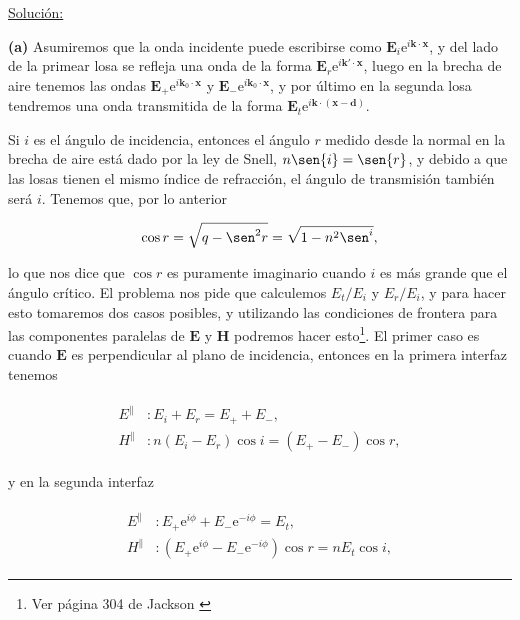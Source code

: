 \documentclass[a4paper,11pt]{article}
\numberwithin{equation}{section}
\newcommand{\euler}{\mathrm{e}}
\begin{document}
\vspace{.3cm}

\underline{Solución:} \vspace{.3cm}

\textbf{(a)} Asumiremos que la onda incidente puede escribirse como $\mathbf{E}_i 
\euler^{i\mathbf{k}\cdot \mathbf{x}}$, y del lado de la primear losa se refleja 
una onda de la forma  $\mathbf{E}_r \euler^{i\mathbf{k'}\cdot \mathbf{x}}$, luego 
en la brecha de aire tenemos las ondas  $\mathbf{E}_+
\euler^{i\mathbf{k}_0\cdot \mathbf{x}}$ y  $\mathbf{E}_- 
\euler^{i\mathbf{k}_0\cdot \mathbf{x}}$, y por último en la segunda losa tendremos 
una onda transmitida de la forma  $\mathbf{E}_t 
\euler^{i\mathbf{k}\cdot (\mathbf{x} - \mathbf{d})}$.

\vspace{.3cm}

Si $i$ es el ángulo de incidencia, entonces el ángulo $r$ medido desde la normal 
en la brecha de aire  está dado por la ley de Snell, $n \sen{i} = \sen{r}$, y
debido a que las losas  tienen el mismo índice de refracción, el ángulo de
transmisión también será $i$. Tenemos que, por lo anterior

\begin{equation}
 \cos{r} = \sqrt{q - \sen^2{r}} = \sqrt{1 - n^2\sen^{i}},
\end{equation}

lo que nos dice que $\cos{r}$ es puramente imaginario cuando $i$ es más grande 
que el ángulo crítico. El problema nos pide que calculemos $E_t/E_i$ y $E_r/E_i$, 
y para hacer esto tomaremos dos casos posibles, y utilizando las condiciones 
de frontera para las componentes paralelas de $\mathbf{E}$ y $\mathbf{H}$ podremos hacer
esto\footnote{Ver página 304 de Jackson \cite{jackson}}. El primer caso es 
cuando $\mathbf{E}$ es perpendicular al plano de incidencia, entonces en la
primera interfaz tenemos 

\begin{align}
  \begin{split}
  E^{\parallel} &: E_i + E_r = E_+ + E_-, \\
  H^{\parallel} &: n(E_i - E_r)\cos{i} = (E_+ - E_-)\cos{r},
  \end{split}
\end{align}

y en la segunda interfaz 

\begin{align}
  \begin{split}
  E^{\parallel} &: E_+\euler^{i\phi} + E_-\euler^{-i\phi} = E_t, \\
  H^{\parallel} &: (E_+\euler^{i\phi} - E_-\euler^{-i\phi})\cos{r} =
  nE_t \cos{i},
  \end{split}
\end{align}
\end{document}
